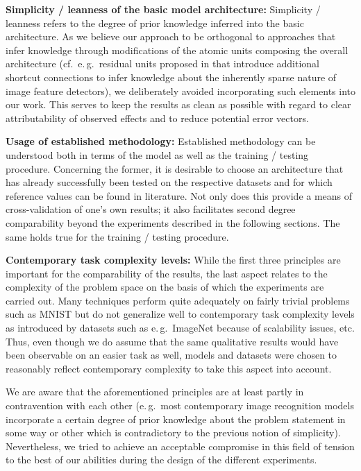 \textbf{Simplicity / leanness of the basic model architecture:} Simplicity / leanness refers to the degree of prior knowledge inferred into the basic architecture. As we believe our approach to be orthogonal to approaches that infer knowledge through modifications of the atomic units composing the overall architecture (cf.\ e.\,g.\ residual units proposed in \cite{He2015-cq} that introduce additional shortcut connections to infer knowledge about the inherently sparse nature of image feature detectors), we deliberately avoided incorporating such elements into our work. This serves to keep the results as clean as possible with regard to clear attributability of observed effects and to reduce potential error vectors.

\textbf{Usage of established methodology:} Established methodology can be understood both in terms of the model as well as the training / testing procedure. Concerning the former, it is desirable to choose an architecture that has already successfully been tested on the respective datasets and for which reference values can be found in literature. Not only does this provide a means of cross-validation of one's own results; it also facilitates second degree comparability beyond the experiments described in the following sections. The same holds true for the training / testing procedure.

\textbf{Contemporary task complexity levels:} While the first three principles are important for the comparability of the results, the last aspect relates to the complexity of the problem space on the basis of which the experiments are carried out. Many techniques perform quite adequately on fairly trivial problems such as MNIST but do not generalize well to contemporary task complexity levels as introduced by datasets such as e.\,g.\ ImageNet because of scalability issues, etc. Thus, even though we do assume that the same qualitative results would have been observable on an easier task as well, models and datasets were chosen to reasonably reflect contemporary complexity to take this aspect into account.

We are aware that the aforementioned principles are at least partly in contravention with each other (e.\,g.\ most contemporary image recognition models incorporate a certain degree of prior knowledge about the problem statement in some way or other which is contradictory to the previous notion of simplicity). Nevertheless, we tried to achieve an acceptable compromise in this field of tension to the best of our abilities during the design of the different experiments.

